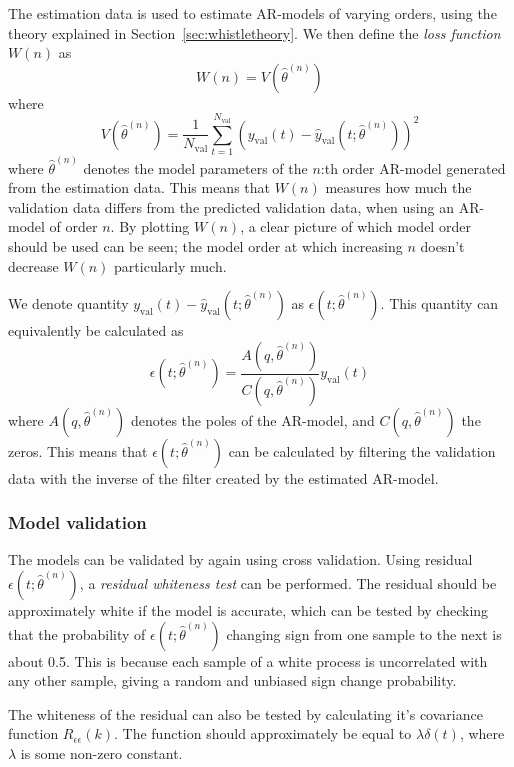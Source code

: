 \documentclass{IEEEtran}
\newcommand{\val}[1]{#1_{\text{val}}}
\begin{document}
The estimation data is used to estimate AR-models of varying orders, using
the theory explained in Section~\ref{sec:whistletheory}. We then define the
\textit{loss function} $W(n)$ as
\begin{equation}
    W(n) = V(\hat{\theta}^{(n)})
\end{equation}
where
\begin{equation}
    V(\hat{\theta}^{(n)}) = \frac{1}{\val{N}}\sum^{\val{N}}_{t=1}(\val{y}(t) -
        \val{\hat{y}}(t;\hat{\theta}^{(n)}))^2
\end{equation}
where $\hat{\theta}^{(n)}$ denotes the model parameters of the $n$:th order
AR-model generated from the estimation data. This means that $W(n)$ measures
how much the validation data differs from the predicted validation data, when
using an AR-model of order $n$. By plotting $W(n)$, a
clear picture of which model order should be used can be seen; the model order at which
increasing $n$ doesn't decrease $W(n)$ particularly much.

We denote quantity $\val{y}(t) - \val{\hat{y}}(t;\hat{\theta}^{(n)})$ as
$\epsilon(t;\hat{\theta}^{(n)})$. This quantity can equivalently be calculated
as
\begin{equation}
    \epsilon(t;\hat{\theta}^{(n)}) =
    \frac{A(q,\hat{\theta}^{(n)})}{C(q,\hat{\theta}^{(n)})}\val{y}(t)
\end{equation}
where $A(q,\hat{\theta}^{(n)})$ denotes the poles of the AR-model, and
$C(q,\hat{\theta}^{(n)})$ the zeros. This means that
$\epsilon(t;\hat{\theta}^{(n)})$ can be calculated by filtering the validation
data with the inverse of the filter created by the estimated AR-model.

\subsubsection{Model validation}
\label{ssub:modelvalidation}
The models can be validated by again using cross validation. Using residual
$\epsilon(t;\hat{\theta}^{(n)})$, a \textit{residual whiteness test} can be
performed. The residual should be approximately white if the model is accurate,
which can be tested by checking that the probability of
$\epsilon(t;\hat{\theta}^{(n)})$ changing sign from one sample to the next is
about 0.5. This is because each sample of a white process is uncorrelated with
any other sample, giving a random and unbiased sign change probability.

The whiteness of the residual can also be tested by calculating it's covariance
function $R_{\epsilon\epsilon}(k)$. The function should approximately be equal
to $\lambda\delta(t)$, where $\lambda$ is some non-zero constant.
\end{document}
